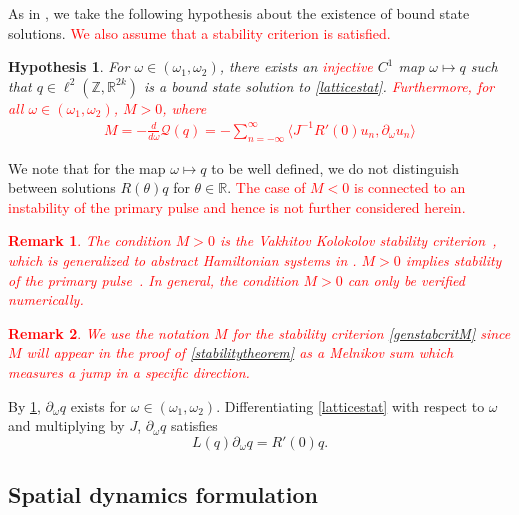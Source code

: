 \documentclass[12pt]{elsarticle}
\def\R{{\mathbb R}}
\def\Z{{\mathbb Z}}
\newtheorem{hypothesis}{Hypothesis}
\newtheorem{remark}{Remark}
\newcommand{\revised}[1]{ \textcolor{red}{#1} }
\begin{document}
As in \cite[Assumption 2]{Grillakis1987}, we take the following hypothesis about the existence of bound state solutions. \revised{We also assume that a stability criterion is satisfied.}
\begin{hypothesis}\label{boundstatehyp}
For $\omega \in (\omega_1, \omega_2)$, there exists an \revised{injective} $C^1$ map $\omega \mapsto q$ such that $q \in \ell^2(\Z, \R^{2k})$ is a bound state solution to \cref{latticestat}. \revised{ Furthermore, for all $\omega \in (\omega_1, \omega_2)$, $M > 0$, where
\begin{align}\label{genstabcritM}
M = -\frac{d}{d\omega} \mathcal{Q}(q) = -\sum_{n = -\infty}^\infty 
\langle J^{-1}R'(0) u_n, \partial_\omega u_n \rangle
\end{align}
}
\end{hypothesis}
We note that for the map $\omega \mapsto q$ to be well defined, we do not distinguish between solutions $R(\theta)q$ for $\theta \in \R$. \revised{The case of $M<0$ is connected
to an instability of the primary pulse and hence is not further considered herein.}
\revised{
\begin{remark}
The condition $M > 0$ is the Vakhitov Kolokolov stability criterion~\cite{Vakhitov1973}, which is generalized to abstract Hamiltonian systems in \cite{Grillakis1987}. $M > 0$ implies stability of the primary pulse~\cite{Grillakis1987}. In general, the condition $M > 0$ can only be verified numerically.
\end{remark}
}
\revised{
\begin{remark}
We use the notation $M$ for the stability criterion \eqref{genstabcritM} since $M$ will appear in the proof of \cref{stabilitytheorem} as a Melnikov sum which measures a jump in a specific direction.
\end{remark}
}
By \cref{boundstatehyp}, $\partial_\omega q$ exists for $\omega \in (\omega_1, \omega_2)$. Differentiating \cref{latticestat} with respect to $\omega$ and multiplying by $J$, $\partial_\omega q$ satisfies 
\begin{equation}\label{Lkernel2}
L(q)\partial_\omega q = R'(0) q.
\end{equation}

\subsection{Spatial dynamics formulation}
\end{document}
